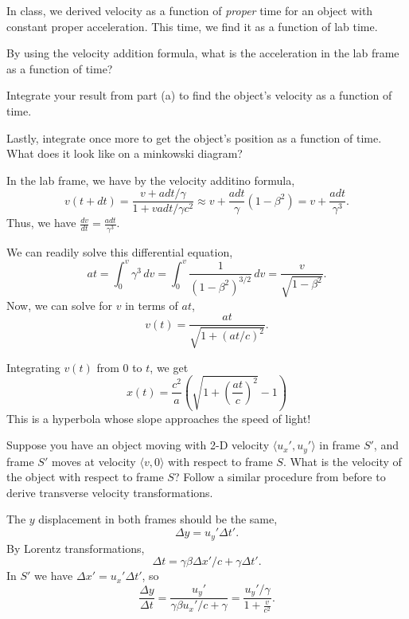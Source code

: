 \documentclass[11pt]{scrartcl}
\begin{document}
\begin{prob}
    In class, we derived velocity as a function of \textit{proper} time for an object with constant proper acceleration. This time, we find it as a function of lab time.
    \begin{anum}
        \item By using the velocity addition formula, what is the acceleration in the lab frame as a function of time?
        \item Integrate your result from part (a) to find the object's velocity as a function of time.
        \item Lastly, integrate once more to get the object's position as a function of time. What does it look like on a minkowski diagram?
    \end{anum}
\end{prob}
\begin{alphasol}
    \item In the lab frame, we have by the velocity additino formula,
    $$v(t+dt) = \frac{v + a dt/\gamma}{1 +v adt/\gamma c^2} \approx v +\frac{adt}{\gamma} (1-\beta^2) = v + \frac{a dt}{\gamma ^3}. $$
    Thus, we have $\frac{dv}{dt} = \frac{adt}{\gamma^3}.$ 
    \item We can readily solve this differential equation,
    $$a t=  \int_0^v \gamma ^3 \, dv = \int_0^v \frac{1}{(1-\beta^2)^{3/2}} \, dv = \frac{v}{\sqrt{1 - \beta^2}}.$$
    Now, we can solve for $v$ in terms of $at$,  $$v(t) = \frac{at}{\sqrt{1 + (at/c)^2}}.$$
    \item Integrating $v(t)$ from $0$ to $t$, we get
    $$x(t) = \frac{c^2}{a}\left(\sqrt{1 + \left(\frac{at}{c}\right)^2} - 1\right)$$
    This is a hyperbola whose slope approaches the speed of light!
\end{alphasol}

\begin{prob}
    Suppose you have an object moving with 2-D velocity $\langle u_x',u_y'
    \rangle$ in frame $S'$, and frame $S'$ moves at velocity $\langle v,0\rangle$ with respect to frame $S$. What is the velocity of the object with respect to frame $S$? Follow a similar procedure from before to derive transverse velocity transformations.
\end{prob}
\begin{sol}
    The $y$ displacement in both frames should be the same,
    $$\Delta y = u_y'\Delta t'.$$
    By Lorentz transformations,
    $$\Delta t = \gamma \beta \Delta x' / c + \gamma  \Delta t'.$$
    In $S'$ we have $\Delta x' = u_x' \Delta t'$, so
    $$\frac{\Delta y}{\Delta t} = \frac{u_y'}{\gamma \beta u_x'/c + \gamma }= \boxed{\frac{u_y'/\gamma}{1 + \frac{v}{c^2}}}.$$
\end{sol}
\end{document}
